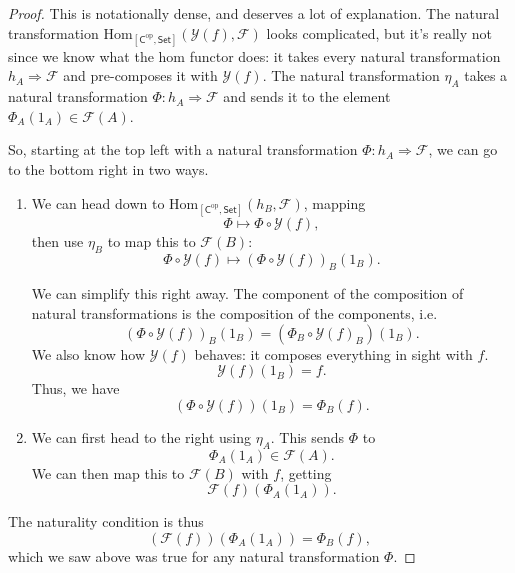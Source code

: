 \documentclass[a4paper,10pt]{scrreprt}
\newcommand{\Hom}{\mathrm{Hom}}
\theoremstyle{definition}
\theoremstyle{plain}
\theoremstyle{remark}
\begin{document}
\begin{proof}
  This is notationally dense, and deserves a lot of explanation. The natural transformation $\Hom_{[\mathsf{C}^{\text{op}}, \mathsf{Set}]}(\mathcal{Y}(f), \mathcal{F})$ looks complicated, but it's really not since we know what the hom functor does: it takes every natural transformation $h_{A} \Rightarrow \mathcal{F}$ and pre-composes it with $\mathcal{Y}(f)$. The natural transformation $\eta_{A}$ takes a natural transformation $\Phi\colon h_{A} \Rightarrow \mathcal{F}$ and sends it to the element $\Phi_{A}(1_{A}) \in \mathcal{F}(A)$.

  So, starting at the top left with a natural transformation $\Phi\colon h_{A} \Rightarrow \mathcal{F}$, we can go to the bottom right in two ways.
  \begin{enumerate}
    \item We can head down to $\Hom_{[\mathsf{C}^{\text{op}}, \mathsf{Set}]}(h_{B}, \mathcal{F})$, mapping 
      \begin{equation*}
        \Phi \mapsto \Phi \circ \mathcal{Y}(f),
      \end{equation*}
      then use $\eta_{B}$ to map this to $\mathcal{F}(B)$:
      \begin{equation*}
        \Phi \circ \mathcal{Y}(f) \mapsto (\Phi \circ \mathcal{Y}(f))_{B}(1_{B}).
      \end{equation*}

      We can simplify this right away. The component of the composition of natural transformations is the composition of the components, i.e.
      \begin{equation*}
        (\Phi \circ \mathcal{Y}(f))_{B}(1_{B}) = (\Phi_{B} \circ \mathcal{Y}(f)_{B})(1_{B}).
      \end{equation*}
      We also know how $\mathcal{Y}(f)$ behaves: it composes everything in sight with $f$.
      \begin{equation*}
        \mathcal{Y}(f)(1_{B}) = f.
      \end{equation*}
      Thus, we have
      \begin{equation*}
        (\Phi \circ \mathcal{Y}(f))(1_{B}) = \Phi_{B}(f).
      \end{equation*}

    \item We can first head to the right using $\eta_{A}$. This sends $\Phi$ to 
      \begin{equation*}
        \Phi_{A}(1_{A}) \in \mathcal{F}(A).
      \end{equation*}
      We can then map this to $\mathcal{F}(B)$ with $f$, getting
      \begin{equation*}
        \mathcal{F}(f)(\Phi_{A}(1_{A})).
      \end{equation*}
  \end{enumerate}

  The naturality condition is thus
  \begin{equation*}
    (\mathcal{F}(f))(\Phi_{A}(1_{A})) = \Phi_{B}(f),
  \end{equation*}
  which we saw above was true for any natural transformation $\Phi$.
\end{proof}
\end{document}
